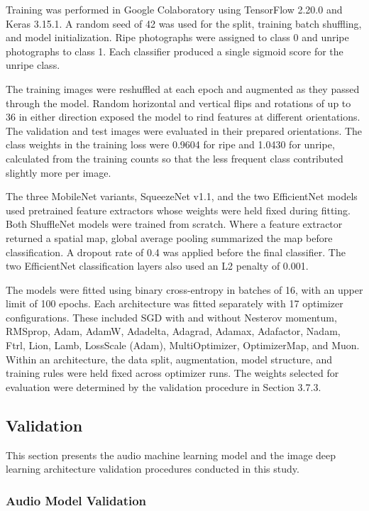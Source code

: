 \begin{thesisprose}
Training was performed in Google Colaboratory using TensorFlow 2.20.0 and Keras 3.15.1. A random seed of 42 was used for the split, training batch shuffling, and model initialization. Ripe photographs were assigned to class 0 and unripe photographs to class 1. Each classifier produced a single sigmoid score for the unripe class.

The training images were reshuffled at each epoch and augmented as they passed through the model. Random horizontal and vertical flips and rotations of up to 36\textdegree{} in either direction exposed the model to rind features at different orientations. The validation and test images were evaluated in their prepared orientations. The class weights in the training loss were 0.9604 for ripe and 1.0430 for unripe, calculated from the training counts so that the less frequent class contributed slightly more per image.

The three MobileNet variants, SqueezeNet v1.1, and the two EfficientNet models used pretrained feature extractors whose weights were held fixed during fitting. Both ShuffleNet models were trained from scratch. Where a feature extractor returned a spatial map, global average pooling summarized the map before classification. A dropout rate of 0.4 was applied before the final classifier. The two EfficientNet classification layers also used an L2 penalty of 0.001.

The models were fitted using binary cross-entropy in batches of 16, with an upper limit of 100 epochs. Each architecture was fitted separately with 17 optimizer configurations. These included SGD with and without Nesterov momentum, RMSprop, Adam, AdamW, Adadelta, Adagrad, Adamax, Adafactor, Nadam, Ftrl, Lion, Lamb, LossScale (Adam), MultiOptimizer, OptimizerMap, and Muon. Within an architecture, the data split, augmentation, model structure, and training rules were held fixed across optimizer runs. The weights selected for evaluation were determined by the validation procedure in Section 3.7.3.

\subsection{Validation}

This section presents the audio machine learning model and the image deep learning architecture validation procedures conducted in this study.

\subsubsection*{Audio Model Validation}


\end{thesisprose}
